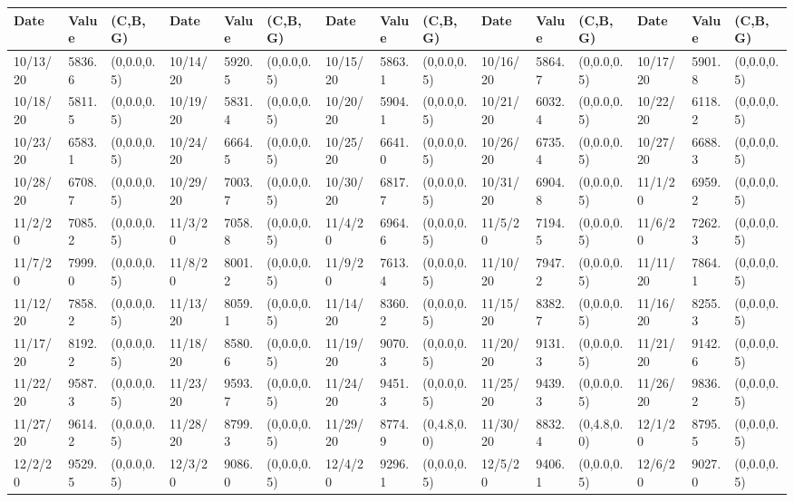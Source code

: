 \documentclass[12pt]{article}
\begin{document}
            \begin{table}
                \tiny
                \begin{center}
                \begin{tabular}{p{15pt}p{15pt}p{25pt}p{15pt}p{15pt}p{25pt}p{15pt}p{15pt}p{25pt}p{15pt}p{15pt}p{25pt}p{15pt}p{15pt}p{25pt}}
                \toprule
                Date & Value&(C,B,G)&Date & Value&(C,B,G)&Date & Value&(C,B,G)&Date & Value&(C,B,G)&Date & Value&(C,B,G)\\
                \midrule
                10/13/20&5836.6&(0,0.0,0.5)&10/14/20&5920.5&(0,0.0,0.5)&10/15/20&5863.1&(0,0.0,0.5)&10/16/20&5864.7&(0,0.0,0.5)&10/17/20&5901.8&(0,0.0,0.5)\\
                10/18/20&5811.5&(0,0.0,0.5)&10/19/20&5831.4&(0,0.0,0.5)&10/20/20&5904.1&(0,0.0,0.5)&10/21/20&6032.4&(0,0.0,0.5)&10/22/20&6118.2&(0,0.0,0.5)\\
                10/23/20&6583.1&(0,0.0,0.5)&10/24/20&6664.5&(0,0.0,0.5)&10/25/20&6641.0&(0,0.0,0.5)&10/26/20&6735.4&(0,0.0,0.5)&10/27/20&6688.3&(0,0.0,0.5)\\
                10/28/20&6708.7&(0,0.0,0.5)&10/29/20&7003.7&(0,0.0,0.5)&10/30/20&6817.7&(0,0.0,0.5)&10/31/20&6904.8&(0,0.0,0.5)&11/1/20&6959.2&(0,0.0,0.5)\\
                11/2/20&7085.2&(0,0.0,0.5)&11/3/20&7058.8&(0,0.0,0.5)&11/4/20&6964.6&(0,0.0,0.5)&11/5/20&7194.5&(0,0.0,0.5)&11/6/20&7262.3&(0,0.0,0.5)\\
                11/7/20&7999.0&(0,0.0,0.5)&11/8/20&8001.2&(0,0.0,0.5)&11/9/20&7613.4&(0,0.0,0.5)&11/10/20&7947.2&(0,0.0,0.5)&11/11/20&7864.1&(0,0.0,0.5)\\
                11/12/20&7858.2&(0,0.0,0.5)&11/13/20&8059.1&(0,0.0,0.5)&11/14/20&8360.2&(0,0.0,0.5)&11/15/20&8382.7&(0,0.0,0.5)&11/16/20&8255.3&(0,0.0,0.5)\\
                11/17/20&8192.2&(0,0.0,0.5)&11/18/20&8580.6&(0,0.0,0.5)&11/19/20&9070.3&(0,0.0,0.5)&11/20/20&9131.3&(0,0.0,0.5)&11/21/20&9142.6&(0,0.0,0.5)\\
                11/22/20&9587.3&(0,0.0,0.5)&11/23/20&9593.7&(0,0.0,0.5)&11/24/20&9451.3&(0,0.0,0.5)&11/25/20&9439.3&(0,0.0,0.5)&11/26/20&9836.2&(0,0.0,0.5)\\
                11/27/20&9614.2&(0,0.0,0.5)&11/28/20&8799.3&(0,0.0,0.5)&11/29/20&8774.9&(0,4.8,0.0)&11/30/20&8832.4&(0,4.8,0.0)&12/1/20&8795.5&(0,0.0,0.5)\\
                12/2/20&9529.5&(0,0.0,0.5)&12/3/20&9086.0&(0,0.0,0.5)&12/4/20&9296.1&(0,0.0,0.5)&12/5/20&9406.1&(0,0.0,0.5)&12/6/20&9027.0&(0,0.0,0.5)\\

\end{tabular}
\end{center}
\end{table}
\end{document}
